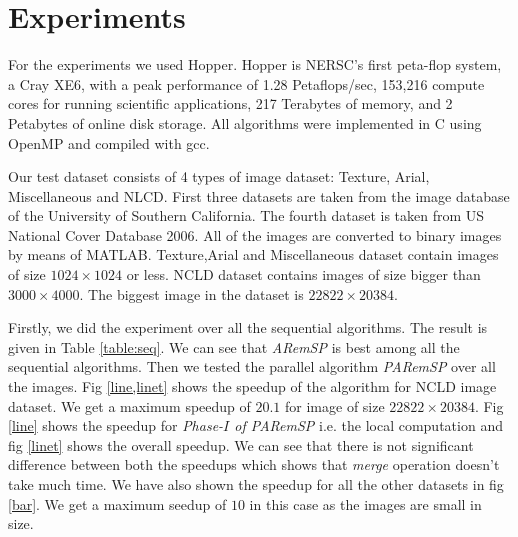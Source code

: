 \section{Experiments}

For the experiments we used Hopper. Hopper is NERSC's first peta-flop system, a Cray XE6, with a peak performance of 1.28 Petaflops/sec, 
153,216 compute cores for running scientific applications, 217 Terabytes of memory, and 2 Petabytes of online disk storage. All algorithms
were implemented in C using OpenMP and compiled with gcc.

Our test dataset consists of 4 types of image dataset: Texture, Arial, Miscellaneous and NLCD. First three datasets are taken from the image database
of the University of Southern California. The fourth dataset is taken from US National Cover Database 2006. All of the images are converted to binary
images by means of MATLAB. Texture,Arial and Miscellaneous dataset contain images of size $1024 \times 1024$ or less. NCLD dataset contains images of
size bigger than $3000 \times 4000$. The biggest image in the dataset is $22822 \times 20384$. 

Firstly, we did the experiment over all the sequential algorithms. The result is given in Table \ref{table:seq}. We can see that {\em ARemSP} is best among all
the sequential algorithms. Then we tested the parallel algorithm {\em PARemSP} over all the images. Fig \ref{line,linet} shows the speedup of the algorithm for 
NCLD image dataset. We get a maximum speedup of $20.1$ for image of size $22822 \times 20384$. Fig \ref{line} shows the speedup for {\em Phase-$I$ of PARemSP} i.e.
the local computation and fig \ref{linet} shows the overall speedup. We can see that there is not significant difference between both the speedups which shows that {\em merge} operation doesn't take much time. We have also shown the speedup for all the other datasets in fig \ref{bar}. We get a maximum seedup of $10$ in this case as the images are small in size.  

